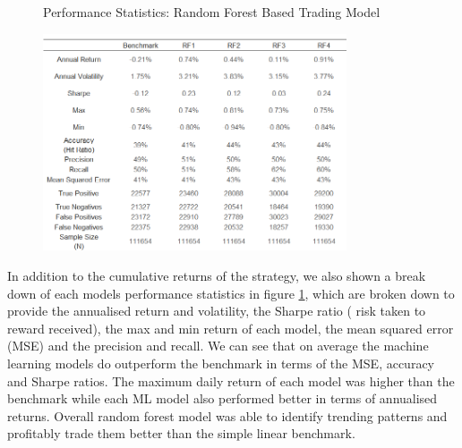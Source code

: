 \documentclass[11pt]{article}
\begin{document}
\begin{figure}[h]
    \centering
	\caption{Performance Statistics: Random Forest Based Trading Model}    
	\includegraphics[width=0.8\textwidth]{RFRandomDataStatsv3}
    \label{fig:RFRandomDataStats}
     \caption*{}
\end{figure}
In addition to the cumulative returns of the strategy, we also shown a break down of each models performance statistics in figure \ref{fig:RFRandomDataStats}, which are broken down to provide the annualised return and volatility, the Sharpe ratio ( risk taken to reward received), the max and min return of each model, the mean squared error (MSE) and the precision and recall. We can see that on average the machine learning models do outperform the benchmark in terms of the MSE, accuracy and Sharpe ratios. The maximum daily return of each model was higher than the benchmark while each ML model also performed better in terms of annualised returns. Overall random forest model was able to identify trending patterns and profitably trade them better than the simple linear benchmark.
\end{document}
